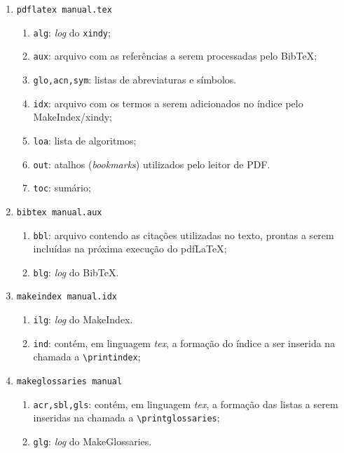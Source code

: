 \documentclass{fei}
\begin{document}
	\begin{enumerate}
	
	\item\verb+pdflatex manual.tex+
	\begin{enumerate}
	\item \texttt{alg}: \emph{log} do \texttt{xindy};
	\item \texttt{aux}: arquivo com as referências a serem processadas pelo Bib\TeX;
	\item \texttt{glo,acn,sym}: listas de abreviaturas e símbolos.
	\item \texttt{idx}: arquivo com os termos a serem adicionados no índice pelo MakeIndex/xindy;	
	\item \texttt{loa}: lista de algoritmos;
	\item \texttt{out}: atalhos (\emph{bookmarks}) utilizados pelo leitor de PDF.
	\item \texttt{toc}: sumário;
	\end{enumerate}	
	
	\item\verb+bibtex manual.aux+
	\begin{enumerate}
	\item \texttt{bbl}: arquivo contendo as citações utilizadas no texto, prontas a serem incluídas na próxima execução do pdf\LaTeX;
	\item \texttt{blg}: \emph{log} do Bib\TeX.
	\end{enumerate}	
	
	\item\verb+makeindex manual.idx+
	\begin{enumerate}
	\item \texttt{ilg}: \emph{log} do MakeIndex.
	\item \texttt{ind}: contém, em linguagem \emph{tex}, a formação do índice a ser inserida na chamada a \verb+\printindex+;
	\end{enumerate}	
	
	\item\verb+makeglossaries manual+
	\begin{enumerate}
	\item \texttt{acr,sbl,gls}:  contém, em linguagem \emph{tex}, a formação das listas a serem inseridas na chamada a \verb+\printglossaries+;
	\item \texttt{glg}: \emph{log} do MakeGlossaries.
	\end{enumerate}
	\end{enumerate}
	
	
\end{document}
